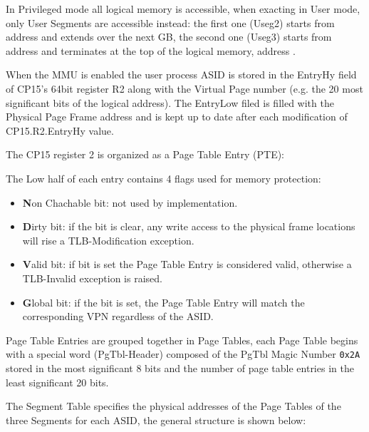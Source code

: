 In Privileged mode all logical memory is accessible, when exacting in User mode, only User Segments are accessible instead: the first one (Useg2) starts from address  and extends over the next GB, the second one (Useg3) starts from address  and terminates at the top of the logical memory, address .



When the MMU is enabled the user process ASID is stored in the EntryHy field of CP15's 64bit register R2 along with the Virtual Page number (e.g. the 20 most significant bits of the logical address). The EntryLow filed is filled with the Physical Page Frame address and is kept up to date after each modification of CP15.R2.EntryHy value.

\label{sec:man:pageTable}
The CP15 register 2 is organized as a Page Table Entry (PTE):
\\


The Low half of each entry contains 4 flags used for memory protection:
\begin{itemize}
\item \textbf{N}on Chachable bit: not used by \uarm{} implementation.
\item \textbf{D}irty bit: if the bit is clear, any write access to the physical frame locations will rise a TLB-Modification exception.
\item \textbf{V}alid bit: if bit is set the Page Table Entry is considered valid, otherwise a TLB-Invalid exception is raised.
\item \textbf{G}lobal bit: if the bit is set, the Page Table Entry will match the corresponding VPN regardless of the ASID.
\end{itemize}

Page Table Entries are grouped together in Page Tables, each Page Table begins with a special word (PgTbl-Header) composed of the PgTbl Magic Number \texttt{0x2A} stored in the most significant 8 bits and the number of page table entries in the least significant 20 bits.



\label{sec:man:segmentTable}
The Segment Table specifies the physical addresses of the Page Tables of the three Segments for each ASID, the general structure is shown below:
\\

